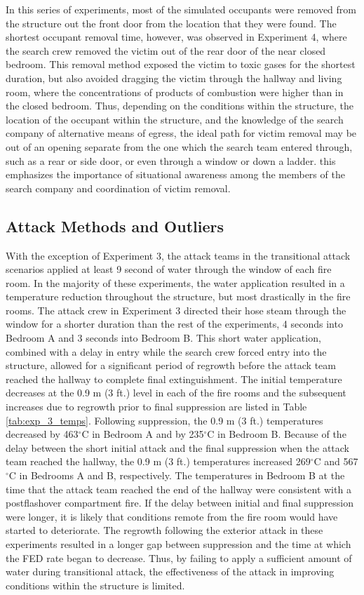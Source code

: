\documentclass[12pt,oneside]{article}
\begin{document}
In this series of experiments, most of the simulated occupants were removed from the structure out the front door from the location that they were found. The shortest occupant removal time, however, was observed in Experiment 4, where the search crew removed the victim out of the rear door of the near closed bedroom. This removal method exposed the victim to toxic gases for the shortest duration, but also avoided dragging the victim through the hallway and living room, where the  concentrations of products of combustion were higher than in the closed bedroom. Thus, depending on the conditions within the structure, the location of the occupant within the structure, and the knowledge of the search company of alternative means of egress, the ideal path for victim removal may be out of an opening separate from the one which the search team entered through, such as a rear or side door, or even through a window or down a ladder. this emphasizes the importance of situational awareness among the members of the search company and coordination of victim removal. 

\subsection{Attack Methods and Outliers}
\label{subsec:fire_attack}

With the exception of Experiment 3, the attack teams in the transitional attack scenarios applied at least 9 second of water through the window of each fire room. In the majority of these experiments, the water application resulted in a temperature reduction throughout the structure, but most drastically in the fire rooms. The attack crew in Experiment 3 directed their hose steam through the window for a shorter duration than the rest of the experiments, 4 seconds into Bedroom A and 3 seconds into Bedroom B. This short water application, combined with a delay in entry while the search crew forced entry into the structure, allowed for a significant period of regrowth before the attack team reached the hallway to complete final extinguishment. The initial temperature decreases at the 0.9 m (3 ft.) level in each of the fire rooms and the subsequent increases due to regrowth prior to final suppression are listed in Table \ref{tab:exp_3_temps}. Following suppression, the 0.9 m (3 ft.) temperatures decreased by 463$^{\circ}$C in Bedroom A and by 235$^{\circ}$C in Bedroom B. Because of the delay between the short initial attack and the final suppression when the attack team reached the hallway, the 0.9 m (3 ft.) temperatures increased 269$^{\circ}$C and 567$^{\circ}$C in Bedrooms A and B, respectively. The temperatures in Bedroom B at the time that the attack team reached the end of the hallway were consistent with a postflashover compartment fire. If the delay between initial and final suppression were longer, it is likely that conditions remote from the fire room would have started to deteriorate. The regrowth following the exterior attack in these experiments resulted in a longer gap between suppression and the time at which the FED rate began to decrease. Thus, by failing to apply a sufficient amount of water  during transitional attack, the effectiveness of the attack in improving conditions within the structure is limited. 
\end{document}
